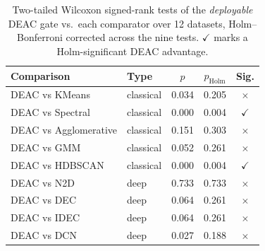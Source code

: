 \begin{table}[htbp]
\centering
\caption{Two-tailed Wilcoxon signed-rank tests of the \emph{deployable} DEAC gate vs.\ each comparator over 12 datasets, Holm--Bonferroni corrected across the nine tests. $\checkmark$ marks a Holm-significant DEAC advantage.}
\label{tab:stats}
\footnotesize
\setlength{\tabcolsep}{4pt}
\begin{tabular}{llccc}
\toprule
Comparison & Type & $p$ & $p_{\text{Holm}}$ & Sig. \\
\midrule
DEAC vs KMeans & classical & 0.034 & 0.205 & $\times$ \\
DEAC vs Spectral & classical & 0.000 & 0.004 & $\checkmark$ \\
DEAC vs Agglomerative & classical & 0.151 & 0.303 & $\times$ \\
DEAC vs GMM & classical & 0.052 & 0.261 & $\times$ \\
DEAC vs HDBSCAN & classical & 0.000 & 0.004 & $\checkmark$ \\
\midrule
DEAC vs N2D & deep & 0.733 & 0.733 & $\times$ \\
DEAC vs DEC & deep & 0.064 & 0.261 & $\times$ \\
DEAC vs IDEC & deep & 0.064 & 0.261 & $\times$ \\
DEAC vs DCN & deep & 0.027 & 0.188 & $\times$ \\
\bottomrule
\end{tabular}
\end{table}
